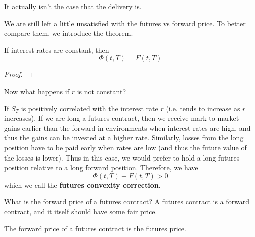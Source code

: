 \documentclass{article}
\begin{document}
    \begin{example}
      \label{ex:convergence-of-basis-gap}
      It actually isn't the case that the delivery is. 
    \end{example}

    We are still left a little unsatisfied with the futures vs forward price.  To better compare them, we introduce the theorem. 

    \begin{theorem}
      \label{thm:constant-interest-rate}
      If interest rates are constant, then 
      \begin{equation}
        \Phi (t, T) = F(t, T)
      \end{equation}
    \end{theorem}

    \begin{proof}
      
    \end{proof}

    Now what happens if $r$ is not constant? 

    \begin{definition}
      \label{def:futures-convexity-correction}
      If $S_T$ is positively correlated with the interest rate $r$ (i.e. tends to increase as $r$ increases). If we are long a futures contract, then we receive mark-to-market gains earlier than the forward in environments when interest rates are high, and thus the gains can be invested at a higher rate. Similarly, losses from the long position have to be paid early when rates are low (and thus the future value of the losses is lower). Thus in this case, we would prefer to hold a long futures position relative to a long forward position. Therefore, we have 
      \begin{equation}
        \Phi (t, T) - F(t, T) > 0
      \end{equation}
      which we call the \textbf{futures convexity correction}.
    \end{definition}

    What is the forward price of a futures contract? A futures contract is a forward contract, and it itself should have some fair price.  

    \begin{theorem}
      \label{thm:forward-price-of-futures-contract}
      The forward price of a futures contract is the futures price.
    \end{theorem}
\end{document}
